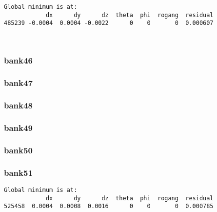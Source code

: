\documentclass[11pt]{article}
\begin{document}
    \begin{Verbatim}[commandchars=\\\{\}]
Global minimum is at:
            dx      dy      dz  theta  phi  rogang  residual
485239 -0.0004  0.0004 -0.0022      0    0       0  0.000607
    \end{Verbatim}

    \begin{center}
    \end{center}
    { \hspace*{\fill} \\}
    
    \hypertarget{bank46}{%
\subsubsection{bank46}\label{bank46}}

    \hypertarget{bank47}{%
\subsubsection{bank47}\label{bank47}}

    \hypertarget{bank48}{%
\subsubsection{bank48}\label{bank48}}

    \hypertarget{bank49}{%
\subsubsection{bank49}\label{bank49}}

    \hypertarget{bank50}{%
\subsubsection{bank50}\label{bank50}}

    \hypertarget{bank51}{%
\subsubsection{bank51}\label{bank51}}

    \begin{Verbatim}[commandchars=\\\{\}]
Global minimum is at:
            dx      dy      dz  theta  phi  rogang  residual
525458  0.0004  0.0008  0.0016      0    0       0  0.000785
    \end{Verbatim}
\end{document}
